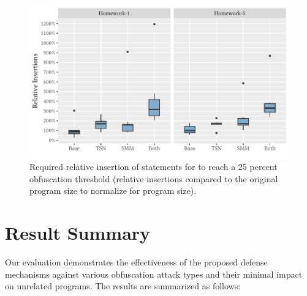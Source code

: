 \begin{figure}[p]
\centering
\includegraphics[width=\linewidth]{figures/disseval/eval-MOSSad-insert.pdf}
\caption[Evaluation Results: Inserted Statements]{Required relative insertion of statements for \mossad to reach a 25 percent obfuscation threshold (relative insertions compared to the original program size to normalize for program size).}
\label{fig:stage5-result-loc}
\end{figure}

\section{Result Summary}\label{sec:result-summary}

Our evaluation demonstrates the effectiveness of the proposed defense mechanisms against various obfuscation attack types and their minimal impact on unrelated programs. The results are summarized as follows:

